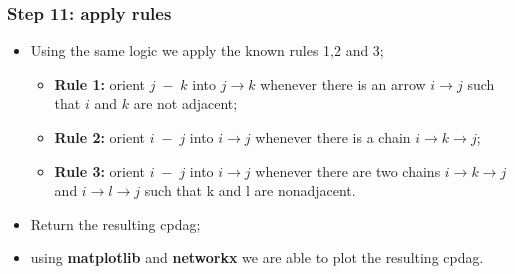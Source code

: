 \documentclass[xcolor ={table,usenames,dvipsnames}]{beamer}
\theoremstyle{definition}
\begin{document}
\begin{frame}
\frametitle{Step 11: apply rules}
\begin{itemize}
	\item Using the same logic we apply the known rules 1,2 and 3;
	\begin{itemize}
		\item \textbf{Rule 1:} orient $j\;-\;k$ into $j \rightarrow k$ whenever there is an arrow  $i \rightarrow j$ such that $i$ and $k$ are not adjacent;
		\item \textbf{Rule 2:} orient $i\;-\;j$ into $i \rightarrow j$ whenever there is a chain $i \rightarrow k \rightarrow j$;
		\item \textbf{Rule 3:} orient $i\;-\;j$ into $i \rightarrow j$ whenever there are two chains $i \rightarrow k \rightarrow j$ and $i \rightarrow l \rightarrow j$ such that k and l are nonadjacent.
	\end{itemize}
	\item Return the resulting cpdag;
	\item using \textbf{matplotlib} and \textbf{networkx} we are able to plot the resulting cpdag.
\end{itemize}
\end{frame}
\end{document}
